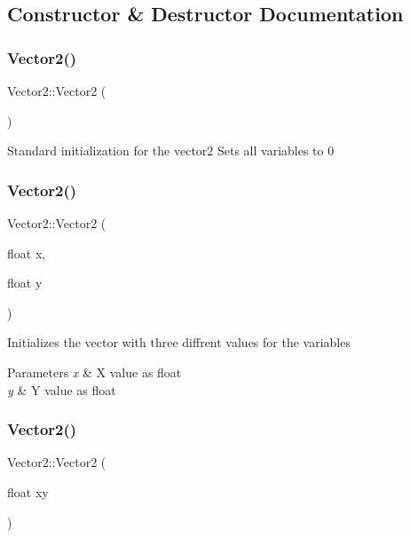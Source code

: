 \subsection{Constructor \& Destructor Documentation}
\mbox{\label{struct_vector2_a22104d1809be26a419ef1f959e3761bf}} 
\subsubsection{\texorpdfstring{Vector2()}{Vector2()}\hspace{0.1cm}{\footnotesize\ttfamily [1/4]}}
{\footnotesize\ttfamily Vector2\+::\+Vector2 (\begin{DoxyParamCaption}{ }\end{DoxyParamCaption})\hspace{0.3cm}{\ttfamily [inline]}}

Standard initialization for the vector2 Sets all variables to 0 \mbox{\label{struct_vector2_a061ab58a0e216c759d64e3746d712b12}} 
\subsubsection{\texorpdfstring{Vector2()}{Vector2()}\hspace{0.1cm}{\footnotesize\ttfamily [2/4]}}
{\footnotesize\ttfamily Vector2\+::\+Vector2 (\begin{DoxyParamCaption}\item[{float}]{x,  }\item[{float}]{y }\end{DoxyParamCaption})\hspace{0.3cm}{\ttfamily [inline]}}

Initializes the vector with three diffrent values for the variables 
\begin{DoxyParams}{Parameters}
{\em x} & X value as float \\
\hline
{\em y} & Y value as float \\
\hline
\end{DoxyParams}
\mbox{\label{struct_vector2_acd4630b163df63998669c10e1971b2d6}} 
\subsubsection{\texorpdfstring{Vector2()}{Vector2()}\hspace{0.1cm}{\footnotesize\ttfamily [3/4]}}
{\footnotesize\ttfamily Vector2\+::\+Vector2 (\begin{DoxyParamCaption}\item[{float}]{xy }\end{DoxyParamCaption})\hspace{0.3cm}{\ttfamily [inline]}}

